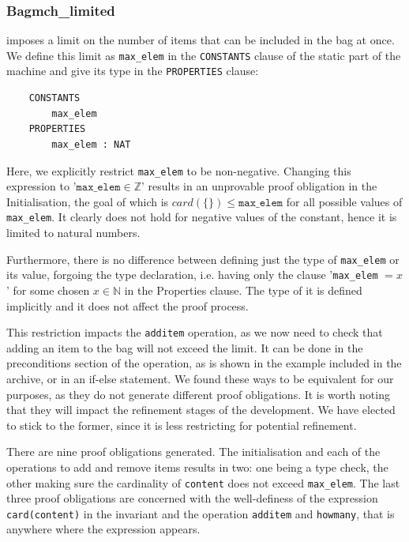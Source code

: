\documentclass[12pt,journal,duplex]{IEEEtran}
\begin{document}
	\subsubsection{Bagmch\_limited} imposes a limit on the number of items that can be included in the bag at once. We define this limit as \texttt{max\_elem} in the \texttt{CONSTANTS} clause of the static part of the machine and give its type in the \texttt{PROPERTIES} clause:

	\begin{lstlisting}
	CONSTANTS
		max_elem
	PROPERTIES
		max_elem : NAT
	\end{lstlisting}

	Here, we explicitly restrict \texttt{max\_elem} to be non-negative. Changing this expression to '$\texttt{max\_elem} \in \mathbb{Z}$' results in an unprovable proof obligation in the Initialisation, the goal of which is $card(\{\}) \leq \texttt{max\_elem}$ for all possible values of \texttt{max\_elem}. It clearly does not hold for negative values of the constant, hence it is limited to natural numbers.

	Furthermore, there is no difference between defining just the type of \texttt{max\_elem} or its value, forgoing the type declaration, i.e. having only the clause '\texttt{max\_elem} $= x$' for some chosen $x \in \mathbb{N}$ in the Properties clause. The type of it is defined implicitly and it does not affect the proof process.

	This restriction impacts the \texttt{additem} operation, as we now need to check that adding an item to the bag will not exceed the limit. It can be done in the preconditions section of the operation, as is shown in the example included in the archive, or in an if-else statement. We found these ways to be equivalent for our purposes, as they do not generate different proof obligations. It is worth noting that they will impact the refinement stages of the development. We have elected to stick to the former, since it is less restricting for potential refinement.

	There are nine proof obligations generated. The initialisation and each of the operations to add and remove items results in two: one being a type check, the other making sure the cardinality of \texttt{content} does not exceed \texttt{max\_elem}. The last three proof obligations are concerned with the well-definess of the expression \texttt{card(content)} in the invariant and the operation \texttt{additem} and \texttt{howmany}, that is anywhere where the expression appears.
\end{document}
